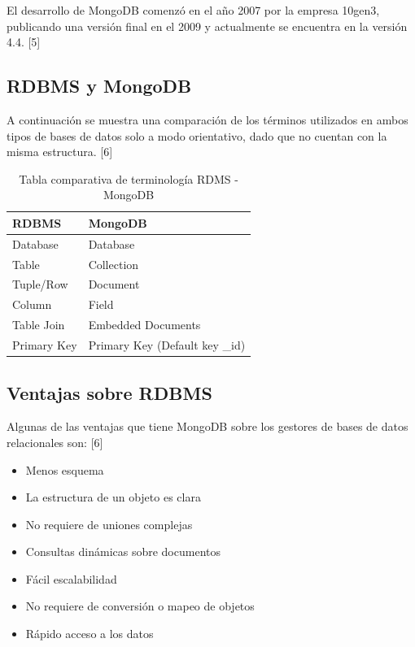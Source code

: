 \documentclass[twocolumn]{article}
\begin{document}
El desarrollo de MongoDB comenzó en el año 2007 por la empresa 10gen3, publicando una versión final en el 2009 y actualmente se encuentra en la versión 4.4. [5]

\subsection{RDBMS y MongoDB}

A continuación se muestra una comparación de los términos utilizados en ambos tipos de bases de datos solo a modo orientativo, dado que no cuentan con la misma estructura. [6]

\begin{table}[h]
\centering
\begin{tabular}{|l|l|}
\hline
\rowcolor[HTML]{67FD9A} 
\textbf{RDBMS} & \textbf{MongoDB}               \\ \hline
Database       & Database                       \\ \hline
Table          & Collection                     \\ \hline
Tuple/Row      & Document                       \\ \hline
Column         & Field                          \\ \hline
Table Join     & Embedded Documents             \\ \hline
Primary Key    & Primary Key (Default key \_id) \\ \hline
\end{tabular}
\caption{Tabla comparativa de terminología RDMS - MongoDB}
\end{table}

\subsection{Ventajas sobre RDBMS}

Algunas de las ventajas que tiene MongoDB sobre los gestores de bases de datos relacionales son: [6]

\begin{itemize}
  \item Menos esquema
  \item La estructura de un objeto es clara
  \item No requiere de uniones complejas
  \item Consultas dinámicas sobre documentos
  \item Fácil escalabilidad
  \item No requiere de conversión o mapeo de objetos
  \item Rápido acceso a los datos
\end{itemize}
\end{document}
